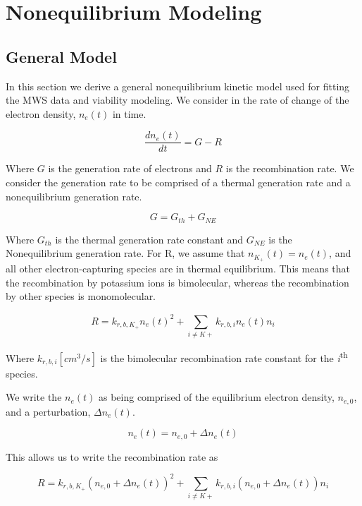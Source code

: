 \section{Nonequilibrium Modeling}

\subsection{General Model}

In this section we derive a general nonequilibrium kinetic model used for fitting the MWS data and viability modeling. We consider in the rate of change of the electron density, \(n_{e}(t)\) in time. 

\begin{equation}
  \label{eq:start_deqn}
\frac{dn_{e}(t)}{dt} = G - R
\end{equation}

Where \(G\) is the generation rate of electrons and \(R\) is the recombination rate. We consider the generation rate to be comprised of a thermal generation rate and a nonequilibrium generation rate.

\begin{equation}
  G = G_{th} + G_{NE}
\end{equation}

Where \(G_{th}\) is the thermal generation rate constant and \(G_{NE}\) is the Nonequilibrium generation rate. For R, we assume that $n_{K_+}(t) = n_{e}(t)$, and all other electron-capturing species are in thermal equilibrium. This means that the recombination by potassium ions is bimolecular, whereas the recombination by other species is monomolecular.

\begin{equation}
R = k_{r, b, K_{+}}n_{e}(t)^2 + \sum_{i \neq K+}^{}k_{r, b, i}n_{e}(t)n_{i}
\end{equation}

Where $k_{r, b, i} [cm^3/s]$ is the bimolecular recombination rate constant for the \emph{i}\textsuperscript{th} species. 

We write the $n_{e}(t)$ as being comprised of the equilibrium electron density, \(n_{e,0}\), and a perturbation, \(\Delta n_{e}(t)\).

\begin{equation}
  \label{eq:ne_pert}
n_{e}(t) = n_{e,0} + \Delta n_{e}(t)
\end{equation}

This allows us to write the recombination rate as

\begin{equation}
R = k_{r, b, K_{+}}(n_{e,0} + \Delta n_{e}(t))^2 + \sum_{i \neq K+}^{}k_{r, b, i}(n_{e,0} + \Delta n_{e}(t))n_{i}
\end{equation}


